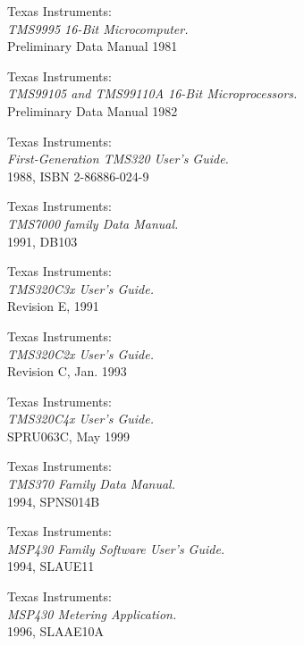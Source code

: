  Texas Instruments: \\
                 {\em TMS9995 16-Bit Microcomputer.\/} \\
                 Preliminary Data Manual
                 1981

 Texas Instruments: \\
                 {\em TMS99105 and TMS99110A 16-Bit Microprocessors.\/} \\
                 Preliminary Data Manual
                 1982

 Texas Instruments: \\
                {\em First-Generation TMS320 User's Guide.\/} \\
                1988, ISBN 2-86886-024-9

 Texas Instruments: \\
                 {\em TMS7000 family Data Manual.\/} \\
                 1991, DB103

 Texas Instruments: \\
                {\em TMS320C3x User's Guide.\/} \\
                Revision E, 1991

 Texas Instruments: \\
                {\em TMS320C2x User's Guide.\/} \\
                Revision C, Jan. 1993

 Texas Instruments: \\
                   {\em TMS320C4x User's Guide.\/} \\
                   SPRU063C, May 1999

 Texas Instruments: \\
                {\em TMS370 Family Data Manual.\/} \\
                1994, SPNS014B

 Texas Instruments: \\
                       {\em MSP430 Family Software User's Guide.\/} \\
                       1994, SLAUE11

 Texas Instruments: \\
                   {\em MSP430 Metering Application.\/} \\
                   1996, SLAAE10A

